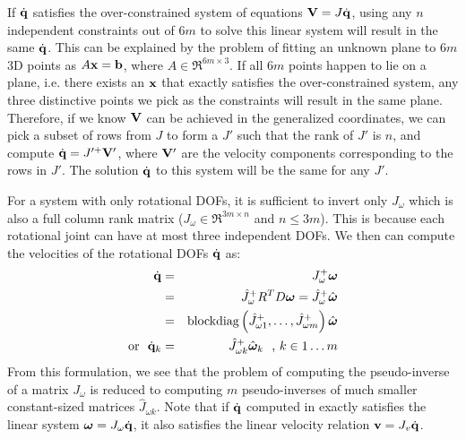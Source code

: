 If $\dot{\mathbf{q}}$ satisfies the over-constrained system of equations $\mathbf{V}
= J\dot{\mathbf{q}}$, using any $n$ independent constraints out of $6m$ to
solve this linear system will result in the same $\dot{\mathbf{q}}$. This
can be explained by the problem of fitting an unknown plane to $6m$ 3D
points as $A\mathbf{x} = \mathbf{b}$, where $A \in \Re^{6m \times 3}$. If all
$6m$ points happen to lie on a plane, i.e. there exists an $\mathbf{x}$
that exactly satisfies the over-constrained system, any three
distinctive points we pick as the constraints will result in the same
plane. Therefore, if we know $\mathbf{V}$ can be achieved in the
generalized coordinates, we can pick a subset of rows from $J$ to form
a $J'$ such that the rank of $J'$ is $n$, and compute $\dot{\mathbf{q}} =
J'^+ \mathbf{V}'$, where $\mathbf{V}'$ are the velocity components
corresponding to the rows in $J'$. The solution $\dot{\mathbf{q}}$ to this
system will be the same for any $J'$.


For a system with only rotational DOFs, it is sufficient
to invert only $J_{\omega}$ which is also a full column rank matrix
($J_{\omega} \in \Re^{3m \times n}$ and $n\leq 3m$). This is because
each rotational joint can have at most three independent DOFs.  We
then can compute the velocities of the rotational DOFs $\dot{\mathbf{q}}$
as:
\begin{eqnarray}
\label{eq:angvel_cart2gen}
\nonumber
 \dot{\mathbf{q}} & = & J_{\omega}^+ \bm{\omega}\\
 \nonumber
 & = &  \hat{J}_{\omega}^+ R^T D\bm{\omega} = \hat{J}_{\omega}^+ \hat{\bm{\omega}} \\
\nonumber
& = & \mbox{blockdiag}\left(\hat{J}_{\omega 1}^+,\hdots,\hat{J}_{\omega m}^+\right ) \hat{\bm{\omega}}\\
\mbox{or\ \ } \dot{\mathbf{q}}_k & = & \hat{J}_{\omega k}^+ \hat{\bm{\omega}}_k \mbox{\ \ , } k \in 1\hdots m
\end{eqnarray}
From this formulation, we see that the problem of computing the
pseudo-inverse of a matrix $J_{\omega}$ is reduced to computing $m$
pseudo-inverses of much smaller constant-sized matrices
$\hat{J}_{\omega k}$. Note that if $\dot{\mathbf{q}}$ computed in
 exactly satisfies the linear system
$\bm{\omega} = J_{\omega} \dot{\mathbf{q}}$, it also satisfies the linear
velocity relation $\mathbf{v} = J_v \dot{\mathbf{q}}$.



